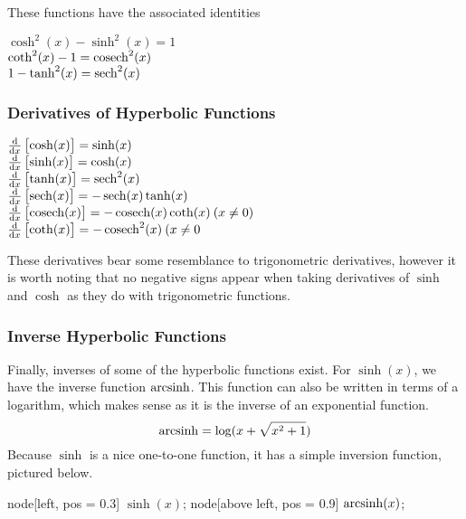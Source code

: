 \documentclass[12pt]{report}
\begin{document}
\begin{flushleft}
These functions have the associated identities

\begin{formulalist}
    \(\cosh^2(x) - \sinh^2(x) = 1\) \\
    \(\coth^2(x) - 1 = \operatorname{cosech}^2(x)\) \\
    \(1 - \tanh^2(x) = \operatorname{sech}^2(x)\) \\
\end{formulalist}

\subsubsection*{Derivatives of Hyperbolic Functions}

\begin{formulalist}
    \(\frac{\mathrm{d}}{\mathrm{d}x}\left[\cosh(x)\right] = \sinh(x)\) \\
    \(\frac{\mathrm{d}}{\mathrm{d}x}\left[\sinh(x)\right] = \cosh(x)\) \\
    \(\frac{\mathrm{d}}{\mathrm{d}x}\left[\tanh(x)\right] = \operatorname{sech}^2(x)\) \\
    \(\frac{\mathrm{d}}{\mathrm{d}x}\left[\operatorname{sech}(x)\right] = -\operatorname{sech}(x)\tanh(x)\) \\
    \(\frac{\mathrm{d}}{\mathrm{d}x}\left[\operatorname{cosech}(x)\right] = -\operatorname{cosech}(x)\coth(x) \:(x \neq 0)\) \\
    \(\frac{\mathrm{d}}{\mathrm{d}x}\left[\coth(x)\right] = -\operatorname{cosech}^2(x) \:(x \neq 0\) \\ 
\end{formulalist}

These derivatives bear some resemblance to trigonometric derivatives,
however it is worth noting that no negative signs appear when taking
derivatives of \(\sinh\) and \(\cosh\) as they do with trigonometric
functions.

\subsubsection*{Inverse Hyperbolic Functions}

Finally, inverses of some of the hyperbolic functions exist. For
\(\sinh(x)\), we have the inverse function \(\operatorname{arcsinh}\). This function can
also be written in terms of a logarithm, which makes sense as it is the inverse
of an exponential function.
\[\operatorname{arcsinh} = \log(x + \sqrt{x^2 + 1})\]
Because \(\sinh\) is a nice one-to-one function, it has a simple inversion 
function, pictured below.

\begin{plot}
    node[left, pos = 0.3] {\(\sinh(x)\)};
    node[above left, pos = 0.9] {\(\operatorname{arcsinh}(x)\)};
\end{plot}


\end{flushleft}
\end{document}
